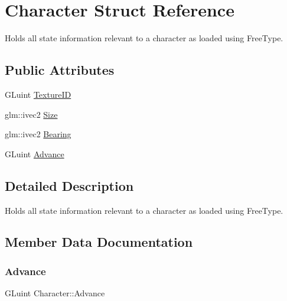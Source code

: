 \hypertarget{structCharacter}{}\section{Character Struct Reference}
\label{structCharacter}


Holds all state information relevant to a character as loaded using Free\+Type.  


\subsection*{Public Attributes}
\begin{DoxyCompactItemize}
\item 
G\+Luint \mbox{\hyperlink{structCharacter_a51d894cc31d79e95fe1a47fb65c6e889}{Texture\+ID}}
\item 
glm\+::ivec2 \mbox{\hyperlink{structCharacter_aaaa598050e0ef590fe6903fd2bab40b8}{Size}}
\item 
glm\+::ivec2 \mbox{\hyperlink{structCharacter_afef98bf9c7f5313d96476f6f3f85f872}{Bearing}}
\item 
G\+Luint \mbox{\hyperlink{structCharacter_ab35bae8be6740729fc5839c237a659f6}{Advance}}
\end{DoxyCompactItemize}


\subsection{Detailed Description}
Holds all state information relevant to a character as loaded using Free\+Type. 

\subsection{Member Data Documentation}
\mbox{\label{structCharacter_ab35bae8be6740729fc5839c237a659f6}} 
\subsubsection{\texorpdfstring{Advance}{Advance}}
{\footnotesize\ttfamily G\+Luint Character\+::\+Advance}

\mbox{\label{structCharacter_afef98bf9c7f5313d96476f6f3f85f872}} 
